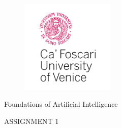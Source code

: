 \begin{titlepage}

\begin{figure}[h]
    \includegraphics[width=0.40\textwidth]{images/unive_logo_2.png}
\end{figure}

\begin{center}
    \vspace*{.08\textheight}
    {\textnormal{\LARGE {Foundations of Artificial Intelligence}}\par}
	\vspace{20mm}
	\fontsize{10mm}{8mm}\selectfont 
    \textup{ASSIGNMENT 1}
\end{center}

\vspace{.075\textheight}




\end{titlepage}